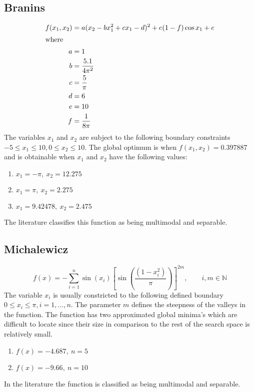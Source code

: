 \subsection{Branins}
\begin{align}
	f(x_1,x_2) &= a(x_2 - bx_1^2 + cx_1 - d)^2 + e(1-f)\cos{x_1} + e \\
\intertext{where}
	a &= 1\nonumber\\
	b &= \frac{5.1}{4\pi^2}\nonumber\\
	c &= \frac{5}{\pi}\nonumber\\
	d &= 6\nonumber\\
	e &= 10\nonumber\\
	f &= \frac{1}{8\pi}\nonumber
\end{align}
The variables $x_1$ and $x_2$ are subject to the following boundary constraints $-5\leq x_1 \leq 10, 0 \leq x_2 \leq 10$\cite{ABCCompareStudy,TSGlobalOptimization,ContinACSTS,TestFunctions}. The global optimum is when $f(x_1,x_2) = 0.397887$ and is obtainable when $x_1$ and $x_2$ have the following values\cite{ABCCompareStudy,TSGlobalOptimization,ContinACSTS,TestFunctions}:
\begin{enumerate}
\item $x_1 = -\pi,\:x_2=12.275$
\item $x_1 = \pi,\:x_2=2.275$
\item $x_1 = 9.42478,\:x_2=2.475$
\end{enumerate}
The literature classifies this function as being multimodal and separable\cite{ABCCompareStudy,TSGlobalOptimization,ContinACSTS,TestFunctions}.
\subsection{Michalewicz}
\begin{equation}
	f(x) = -\sum_{i=1}^n\sin{(x_i)}[\sin{(\frac{(1 - x_i^2)}{\pi})}]^{2m}, \qquad i,m \in \mathbb{N}
\end{equation}
The variable $x_i$ is usually constricted to the following defined boundary $0 \leq x_i \leq \pi, i = 1,\ldots,n$\cite{ABCCompareStudy,TestFunctions}. The parameter $m$ defines the steepness of the valleys in the function. The function has two approximated global minima's which are difficult to locate since their size in comparison to the rest of the search space is relatively small\cite{ABCCompareStudy,TestFunctions}.
\begin{enumerate}
\item $f(x) = -4.687,\: n = 5$
\item $f(x) = -9.66,\: n = 10$
\end{enumerate}
In the literature the function is classified as being multimodal and separable\cite{ABCCompareStudy}.
